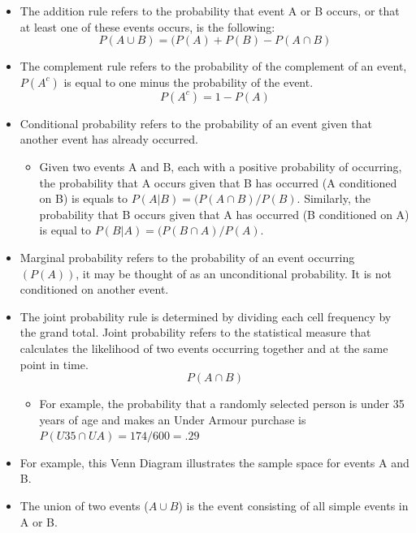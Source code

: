 \documentclass[
  letterpaper,
  DIV=11,
  numbers=noendperiod]{scrreprt}
\providecommand{\tightlist}{%
  \setlength{\itemsep}{0pt}\setlength{\parskip}{0pt}}\usepackage{longtable,booktabs,array}
\begin{document}
\begin{itemize}
\tightlist
\item
  The addition rule refers to the probability that event A or B occurs,
  or that at least one of these events occurs, is the following:\\
  \[P(A \cup B) = (P(A) + P(B) - P(A \cap B)\]
\item
  The complement rule refers to the probability of the complement of an
  event, \(P(A^c)\) is equal to one minus the probability of the
  event.\\
  \[P(A^c) = 1-P(A)\]
\item
  Conditional probability refers to the probability of an event given
  that another event has already occurred.

  \begin{itemize}
  \tightlist
  \item
    Given two events A and B, each with a positive probability of
    occurring, the probability that A occurs given that B has occurred
    (A conditioned on B) is equals to \(P(A|B) = (P(A \cap B)/P(B)\).
    Similarly, the probability that B occurs given that A has occurred
    (B conditioned on A) is equal to \(P(B|A) = (P(B \cap A)/P(A)\).
  \end{itemize}
\item
  Marginal probability refers to the probability of an event occurring
  \((P(A))\), it may be thought of as an unconditional probability. It
  is not conditioned on another event.
\item
  The joint probability rule is determined by dividing each cell
  frequency by the grand total. Joint probability refers to the
  statistical measure that calculates the likelihood of two events
  occurring together and at the same point in time.\\
  \[P(A \cap B)\]

  \begin{itemize}
  \tightlist
  \item
    For example, the probability that a randomly selected person is
    under 35 years of age and makes an Under Armour purchase is
    \(P(U35 \cap UA)=174/600= .29\)
  \end{itemize}
\item
  For example, this Venn Diagram illustrates the sample space for events
  A and B.
\item
  The union of two events (\(A \cup B\)) is the event consisting of all
  simple events in A or B.
\end{itemize}
\end{document}
